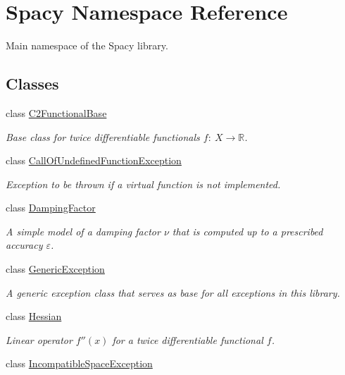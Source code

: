 \hypertarget{namespaceSpacy}{}\section{Spacy Namespace Reference}
\label{namespaceSpacy}


Main namespace of the Spacy library.  


\subsection*{Classes}
\begin{DoxyCompactItemize}
\item 
class \hyperlink{classSpacy_1_1C2FunctionalBase}{C2\+Functional\+Base}
\begin{DoxyCompactList}\small\item\em Base class for twice differentiable functionals $ f:\ X\rightarrow \mathbb{R}$. \end{DoxyCompactList}\item 
class \hyperlink{classSpacy_1_1CallOfUndefinedFunctionException}{Call\+Of\+Undefined\+Function\+Exception}
\begin{DoxyCompactList}\small\item\em Exception to be thrown if a virtual function is not implemented. \end{DoxyCompactList}\item 
class \hyperlink{classSpacy_1_1DampingFactor}{Damping\+Factor}
\begin{DoxyCompactList}\small\item\em A simple model of a damping factor $\nu$ that is computed up to a prescribed accuracy $\varepsilon$. \end{DoxyCompactList}\item 
class \hyperlink{classSpacy_1_1GenericException}{Generic\+Exception}
\begin{DoxyCompactList}\small\item\em A generic exception class that serves as base for all exceptions in this library. \end{DoxyCompactList}\item 
class \hyperlink{classSpacy_1_1Hessian}{Hessian}
\begin{DoxyCompactList}\small\item\em Linear operator $f''(x)$ for a twice differentiable functional $f$. \end{DoxyCompactList}\item 
class \hyperlink{classSpacy_1_1IncompatibleSpaceException}{Incompatible\+Space\+Exception}

\end{DoxyCompactItemize}
